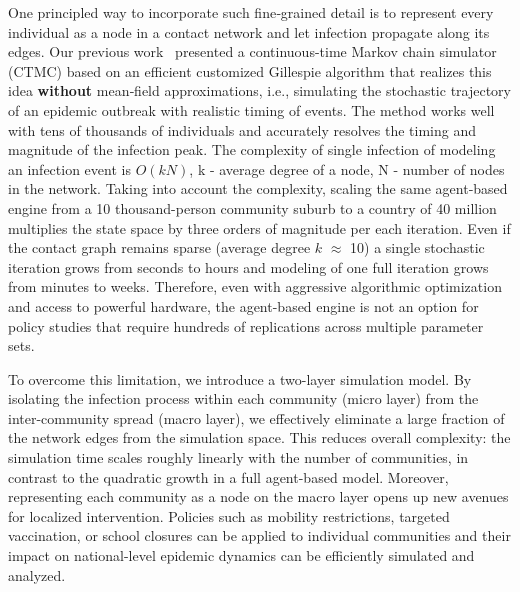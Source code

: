 \documentclass[
]{ceurart}
\begin{document}
One principled way to incorporate such fine‑grained detail is to represent every individual as a node in a contact network and let infection propagate along its edges. Our previous work~\cite{kuryliak2025simulating} presented a continuous-time Markov chain simulator (CTMC) based on an efficient customized Gillespie algorithm that realizes this idea \textbf{without} mean‑field approximations, i.e., simulating the stochastic trajectory of an epidemic outbreak with realistic timing of events. 
The method works well with tens of thousands of individuals and accurately resolves the timing and magnitude of the infection peak. The complexity of single infection of modeling an infection event is $O(kN)$, k - average degree of a node, N - number of nodes in the network. Taking into account the complexity, scaling the same agent‑based engine from a 10 thousand-person community suburb to a country of 40 million multiplies the state space by three orders of magnitude per each iteration. Even if the contact graph remains sparse (average degree $k$ $\approx$ 10) a single stochastic iteration grows from seconds to hours and modeling of one full iteration grows from minutes to weeks. Therefore, even with aggressive algorithmic optimization and access to powerful hardware, the agent-based engine is not an option for policy studies that require hundreds of replications across multiple parameter sets.


To overcome this limitation, we introduce a two-layer simulation model. By isolating the infection process within each community (micro layer) from the inter-community spread (macro layer), we effectively eliminate a large fraction of the network edges from the simulation space. This reduces overall complexity: the simulation time scales roughly linearly with the number of communities, in contrast to the quadratic growth in a full agent-based model. Moreover, representing each community as a node on the macro layer opens up new avenues for localized intervention. Policies such as mobility restrictions, targeted vaccination, or school closures can be applied to individual communities and their impact on national-level epidemic dynamics can be efficiently simulated and analyzed.
\end{document}
